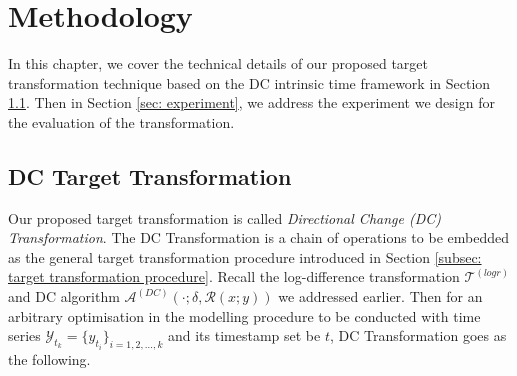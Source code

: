 \chapter{Methodology}\label{ch: methodology}
In this chapter, we cover the technical details of our proposed target transformation technique based on the DC intrinsic time framework in Section \ref{sec: dc transformation}. Then in Section \ref{sec: experiment}, we address the experiment we design for the evaluation of the transformation.

\section{DC Target Transformation}\label{sec: dc transformation}
Our proposed target transformation is called \textit{Directional Change (DC) Transformation}. The DC Transformation is a chain of operations to be embedded as the general target transformation procedure introduced in Section \ref{subsec: target transformation procedure}. Recall the log-difference transformation $\mathcal{T}^{(logr)}$ and DC algorithm $\mathcal{A}^{(DC)} (\cdot; \delta, \mathcal{R} (x; y))$ we addressed earlier. Then for an arbitrary optimisation in the modelling procedure to be conducted with time series $\mathcal{Y}_{t_k} = \{y_{t_i}\}_{i = 1, 2, \ldots, k}$ and its timestamp set be $t$, DC Transformation goes as the following.

